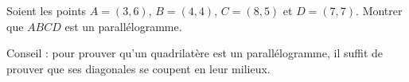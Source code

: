 
\begin{exercice}\label{exoSeconde-0055}

    Soient les points \( A=(3,6)\), \( B=(4,4)\), \( C=(8,5)\) et \( D=(7,7)\). Montrer que \( ABCD\) est un parallélogramme.

    Conseil : pour prouver qu'un quadrilatère est un parallélogramme, il suffit de prouver que ses diagonales se coupent en leur milieux.

\end{exercice}
